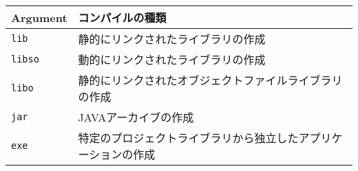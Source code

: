 \begin{tabular}{ll}
 Argument & コンパイルの種類 \\
 \hline
 \texttt{lib} & 静的にリンクされたライブラリの作成 \\
 \texttt{libso} & 動的にリンクされたライブラリの作成 \\
 \texttt{libo} & 静的にリンクされたオブジェクトファイルライブラリの作成 \\
 \texttt{jar} & JAVAアーカイブの作成 \\
 \texttt{exe} & 特定のプロジェクトライブラリから独立したアプリケーションの作成 \\
 \hline
\end{tabular}
